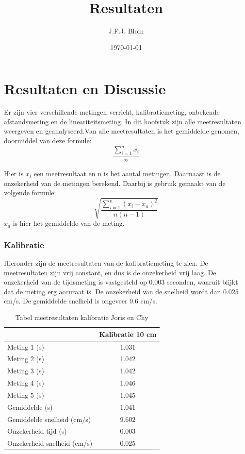 \documentclass{report}
\title{Resultaten}
\author{J.F.J. Blom}
\date{\today}
\begin{document}
\chapter{Resultaten en Discussie}
Er zijn vier verschillende metingen verricht, kalibratiemeting, onbekende afstandsmeting en de lineariteitsmeting. In dit hoofstuk zijn alle meetresultaten weergeven en geanalyseerd.Van alle meetresultaten is het gemiddelde genomen, doormiddel van deze formule:
\begin{equation}
\frac{\sum_{i=1}^{n}x_i}{n}
\end{equation}

Hier is $x_i$ een meetresultaat en n is het aantal metingen. 
Daarnaast is de onzekerheid van de metingen berekend. Daarbij is gebruik gemaakt van de volgende formule:
\begin{equation}
\sqrt{\frac{\sum_{i=1}^{n}( x_i-x_a)^2}{n(n-1)}}
\end{equation}
$x_a$ is hier het gemiddelde van de meting.
\subsection*{Kalibratie}
Hieronder zijn de meetresultaten van de kalibratiemeting te zien. De meetresultaten zijn vrij constant, en dus is de onzekerheid vrij laag. De onzekerheid van de tijdsmeting is vastgesteld op 0.003 seconden, waaruit blijkt dat de meting erg accuraat is. De onzekerheid van de snelheid wordt dan 0.025 cm/s. De gemiddelde snelheid is ongeveer 9.6 cm/s.

\begin{table}
 \centering
\begin{tabular}{| l| c|}
\hline
    & Kalibratie 10 cm \\
\hline
   Meting 1 (s) & 1.031 \\
\hline
   Meting 2 (s) & 1.042 \\
\hline
   Meting 3 (s) & 1.042 \\
\hline
   Meting 4 (s) & 1.046 \\
\hline
   Meting 5 (s) & 1.045 \\
\hline
   Gemiddelde (s) & 1.041 \\
\hline
   Gemiddelde snelheid (cm/s) & 9.602 \\
\hline
   Onzekerheid tijd (s) & 0.003 \\
\hline
   Onzekerheid snelheid (cm/s) & 0.025 \\
\hline
\end{tabular}
\caption{Tabel meetresultaten kalibratie Joris en Chy}
\end{table}
\end{document}
